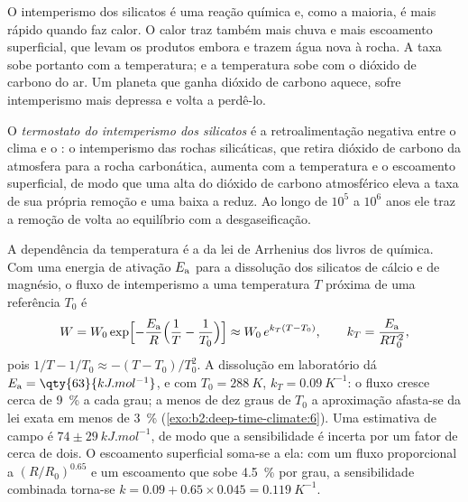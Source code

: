 O intemperismo dos silicatos é uma reação química e, como a maioria, é mais rápido quando faz calor. O calor
traz também mais chuva e mais escoamento superficial, que levam os produtos embora e trazem água nova à
rocha. A taxa sobe portanto com a temperatura; e a temperatura sobe com o dióxido de carbono do
ar. Um planeta que ganha dióxido de carbono aquece, sofre intemperismo mais depressa e volta a perdê-lo.

\begin{definition}\label{def:b2:deep-time-climate:thermostat}
O \emph{termostato do intemperismo dos silicatos} é a
retroalimentação negativa entre o clima e o : o intemperismo das rochas silicáticas, que
retira dióxido de carbono da atmosfera para a rocha carbonática, aumenta com a temperatura e o
escoamento superficial, de modo que uma alta do dióxido de carbono atmosférico eleva a taxa de sua própria remoção e uma
baixa a reduz. Ao longo de $10^5$ a $10^6$ anos ele traz a remoção de volta ao equilíbrio com a
desgaseificação.
\end{definition}

A dependência da temperatura é a da lei de Arrhenius dos livros de química. Com uma energia de ativação
$E_{\text a}$ para a dissolução dos silicatos de cálcio e de magnésio, o fluxo de intemperismo a
uma temperatura $T$ próxima de uma referência $T_0$ é
\[
  W = W_0 \exp\Bigl[-\frac{E_{\text a}}{R}\Bigl(\frac1T - \frac1{T_0}\Bigr)\Bigr]
  \approx W_0\, e^{k_T (T - T_0)}, \qquad k_T = \frac{E_{\text a}}{R T_0^2},
\]
pois $1/T - 1/T_0 \approx -(T - T_0)/T_0^2$. A dissolução em laboratório dá $E_{\text a} =
\qty{63}{kJ.mol^{-1}}$, e com $T_0 = \qty{288}{K}$, $k_T = \qty{0.09}{K^{-1}}$: o fluxo cresce
cerca de \qty{9}{\percent} a cada grau; a menos de dez graus de $T_0$ a aproximação afasta-se
da lei exata em menos de \qty{3}{\percent} (\cref{exo:b2:deep-time-climate:6}). Uma estimativa de campo é
$74 \pm \qty{29}{kJ.mol^{-1}}$, de modo que a sensibilidade é incerta por um fator de cerca de dois. O escoamento
superficial soma-se a ela: com um fluxo proporcional a $(R/R_0)^{0.65}$ e um escoamento que sobe
\qty{4.5}{\percent} por grau, a sensibilidade combinada torna-se $k = 0.09 + 0.65\times0.045 =
\qty{0.119}{K^{-1}}$.

